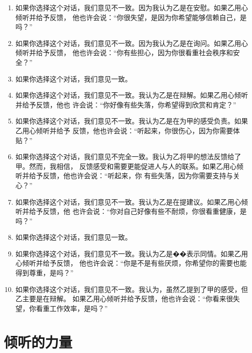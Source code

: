 \documentclass{ctexart}
\begin{document}
\begin{enumerate}
	\item 如果你选择这个对话，我们意见不一致。因为我认为乙是在安慰。如果乙用心倾听并给予反馈，
	      他也许会说：``你很失望，是因为你希望能够信赖自己，是吗？''

	\item 如果你选择这个对话，我们意见不一致。因为我认为乙是在询问。如果乙用心倾听并给予反馈，
	      他也许会说：``你有些担心，因为你很看重社会秩序和安全？''

	\item 如果你选择这个对话，我们意见一致。

	\item 如果你选择这个对话，我们意见不一致。我认为乙是在辩解。如果乙用心倾听并给予反馈，他也
	      许会说：``你好像有些失落，你希望得到欣赏和肯定？''

	\item 如果你选择这个对话，我们意见不一致。我认为乙是在为甲的感受负责。如果乙用心倾听并给予
	      反馈，他也许会说：``听起来，你很伤心，因为你需要体贴？''

	\item 如果你选择这个对话，我们意见不完全一致。我认为乙将甲的想法反馈给了甲。然而，我相信，
	      反馈感受和需要更能促进人与人的联系。如果乙用心倾听并给予反馈，他也许会说：``听起来，你
	      有些失落，因为你需要支持与关心？''

	\item 如果你选择这个对话，我们意见不一致。我认为乙是在提建议。如果乙用心倾听并给予反馈，他
	      也许会说：``你对自己好像有些不耐烦，你很看重健康，是吗？''

	\item 如果你选择这个对话，我们意见一致。

	\item 如果你选择这个对话，我们意见不一致。我认为乙是��表示同情。如果乙用心倾听并给予反馈，
	      他也许会说：``你是不是有些厌烦，你希望你的需要也能得到尊重，是吗？''

	\item 如果你选择这个对话，我们意见不一致。我认为，虽然乙提到了甲的感受，但乙主要是在辩解。
	      如果乙用心倾听并给予反馈，他也许会说：``你看来很失望，你看重工作效率，是吗？''

\end{enumerate}

\protect


\section{倾听的力量}\label{sec:倾听的力量}
\end{document}
